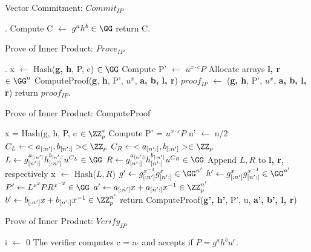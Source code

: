 \begin{algorithm}
 \DontPrintSemicolon
    \caption{Vector Commitment: $Commit_{IP}$}
    \label{alg:vector_commitment}
    \LinesNumbered
    
    .
    Compute C $\gets$ $g^ah^b \in \GG$ \;
    return C.
\end{algorithm}

\begin{algorithm}
 \DontPrintSemicolon
    \caption{Prove of Inner Product: $Prove_{IP}$}
    \label{alg:prove_ip}
    \LinesNumbered
    
    .
    x $\gets$ Hash(\textbf{g, h}, P, c) $\in \GG$ \;
    Compute P' $\gets$ $u^{x\cdot c}P$ \;
    Allocate arrays \textbf{l, r} $\in \GG^n$ \;
    ComputeProof(\textbf{g}, \textbf{h}, P', $u^x$, \textbf{a, b, l, r})\;
    $proof_{IP}$ $\gets$ (\textbf{g, h}, P', $u^x$, \textbf{a, b, l, r}) \; 
    return $proof_{IP}$.
\end{algorithm}

\begin{algorithm}
    \caption{Prove of Inner Product: ComputeProof}
    \label{alg:compute_proof}
    \LinesNumbered
    x = Hash(g, h, P, c $\in \ZZ_p^*$\;
    Compute P' = $u^{x\cdot c}P$ \;
     {
        n' $\gets$ n/2 \;
        $C_L \gets <a_{[:n']}, b_{[n':]}> \in \ZZ_p$\;
        $C_R \gets <a_{[n':]}, b_{[:n']}> \in \ZZ_p$\;
        $L \gets g_{[n':]}^{a_{[:n']}} h_{[:n']}^{b_{[n':]}}u^{C_L} \in \GG$ \;
        $R \gets g_{[n':]}^{a_{[n':]}} h_{[n':]}^{b_{[:n']}}u^{C_R} \in \GG$ \;
        Append $L, R$ to \textbf{l, r}, respectively\;
        x $\gets$ Hash($L, R$)\;
        $g' \gets g_{[:n']}^{x^{-1}} g_{[n':]}^{x} \in \GG^{n'}$ \;
        $h' \gets g_{[:n']}^{x} g_{[n':]}^{x^{-1}} \in \GG^{n'}$ \;
        $P' \gets L^{x^2}PR^{x^{-2}} \in \GG$ \;
        $a' \gets a_{[:n']}x + a_{[n':]}x^{-1} \in \ZZ_p^{n'}$ \;
        $b' \gets b_{[:n']}x + b_{[n':]}x^{-1} \in \ZZ_p^{n'}$ \;
        return ComputeProof(\textbf{g', h'}, P', u, \textbf{a', b', l, r})
    }
\end{algorithm}

\begin{algorithm}
 \DontPrintSemicolon
    \caption{Prove of Inner Product: $Verify_{IP}$}
    \label{alg:verify_ip}
    \LinesNumbered
    
    
    i $\gets$ 0 \;
    The verifier computes c = a$\cdot$ and accepts if $P = g^ah^bu^c$.
\end{algorithm}

